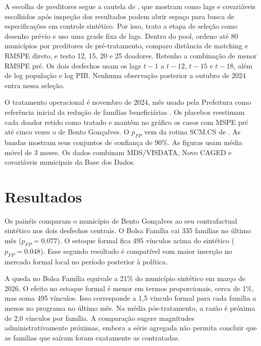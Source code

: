 \documentclass[10pt]{article}
\begin{document}
A escolha de preditores segue a cautela de \citet{ferman2020cherrypicking}, que mostram como lags e covariáveis escolhidos após inspeção dos resultados podem abrir espaço para busca de especificações em controle sintético. Por isso, trato a etapa de seleção como desenho prévio e uso uma grade fixa de lags. Dentro do pool, ordeno até 80 municípios por preditores de pré-tratamento, comparo distância de matching e RMSPE direto, e testo 12, 15, 20 e 25 doadores. Retenho a combinação de menor RMSPE pré. Os dois desfechos usam os lags $t-1$ a $t-12$, $t-15$ e $t-18$, além de log população e log PIB. Nenhuma observação posterior a outubro de 2024 entra nessa seleção.

O tratamento operacional é novembro de 2024, mês usado pela Prefeitura como referência inicial da redução de famílias beneficiárias \citep{prefeiturabento2025bolsafamilia}. Os placebos reestimam cada doador retido como tratado e mantêm no gráfico os casos com MSPE pré até cinco vezes o de Bento Gonçalves. O $p_{FP}$ vem da rotina SCM.CS de \citet{firpo2018synthetic}. As bandas mostram seus conjuntos de confiança de 90\%. As figuras usam média móvel de 3 meses. Os dados combinam MDS/VISDATA, Novo CAGED e covariáveis municipais da Base dos Dados.

\begin{table}[t]
\centering
\caption{Estimativas de controle sintético para Bolsa Família e emprego formal}
\label{tab:results}

\end{table}

\FloatBarrier
\vspace{3pt}
\section{Resultados}

Os painéis comparam o município de Bento Gonçalves ao seu contrafactual sintético nos dois desfechos centrais. O Bolsa Família cai 335 famílias no último mês ($p_{FP}=0.077$). O estoque formal fica 495 vínculos acima do sintético ($p_{FP}=0.048$). Esse segundo resultado é compatível com maior inserção no mercado formal local no período posterior à política.

A queda no Bolsa Família equivale a 21\% do município sintético em março de 2026. O efeito no estoque formal é menor em termos proporcionais, cerca de 1\%, mas soma 495 vínculos. Isso corresponde a 1,5 vínculo formal para cada família a menos no programa no último mês. Na média pós-tratamento, a razão é próxima de 2,0 vínculos por família. A comparação sugere magnitudes administrativamente próximas, embora a série agregada não permita concluir que as famílias que saíram foram exatamente as contratadas.
\end{document}
